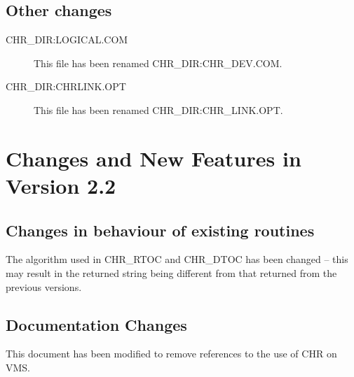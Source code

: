 \documentclass[twoside,11pt,nolof]{starlink}
\begin{document}
\subsection {Other changes}

\begin{description}
\item [CHR\_DIR:LOGICAL.COM] This file has been renamed CHR\_DIR:CHR\_DEV.COM.
\item [CHR\_DIR:CHRLINK.OPT] This file has been renamed CHR\_DIR:CHR\_LINK.OPT.
\end {description}

\section {Changes and New Features in Version 2.2}
\subsection {Changes in behaviour of existing routines}
The algorithm used in CHR\_RTOC and CHR\_DTOC has been changed --
this may result in the returned string being different from that returned
from the previous versions.

\subsection{Documentation Changes}
This document has been modified to remove references to the use of CHR on VMS.
\end{document}
